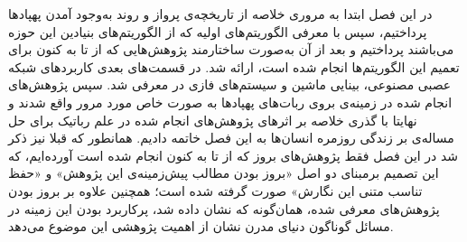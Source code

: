 در این فصل ابتدا به مروری خلاصه از تاریخچه‌ی پرواز و روند به‌وجود آمدن پهپادها پرداختیم، سپس با معرفی الگوریتم‌های اولیه  که از الگوریتم‌های بنیادین این حوزه می‌باشند پرداختیم و بعد از آن به‌صورت ساختارمند پژوهش‌هایی که از  تا به کنون برای تعمیم این الگوریتم‌ها انجام شده است، ارائه شد. در قسمت‌های بعدی کاربردهای شبکه عصبی مصنوعی، بینایی ماشین و سیستم‌های فازی در  معرفی شد. سپس پژوهش‌های انجام شده در زمینه‌ی  بروی ربات‌های پهپاد‌ها به صورت خاص مورد مرور واقع شدند و نهایتا با گذری خلاصه بر اثرهای پژوهش‌های انجام شده در علم رباتیک برای حل مساله‌ی  بر زندگی روزمره انسان‌ها به این فصل خاتمه دادیم.
همانطور که قبلا نیز ذکر شد در این فصل فقط پژوهش‌های بروز که از  تا به کنون انجام شده است آورده‌ایم، که این تصمیم برمبنای دو اصل «بروز بودن مطالب پیش‌زمینه‌ی این پژوهش» و «حفظ تناسب متنی این نگارش» صورت گرفته شده است؛ همچنین علاوه بر بروز بودن پژوهش‌های معرفی شده، همان‌گونه که نشان داده شد، پرکاربرد بودن این زمینه در مسائل گوناگون دنیای مدرن نشان از اهمیت پژوهشی این موضوع می‌دهد.